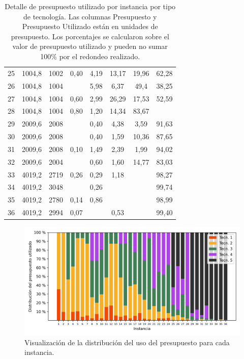 \begin{table}
\begin{tabular}{SSSSSSSS}
      25 & 1004,8 & 1002 & 0,40 & 4,19 & 13,17 & 19,96 & 62,28 \\
      26 & 1004,8 & 1004 &  & 5,98 & 6,37 & 49,4 & 38,25 \\
      27 & 1004,8 & 1004 & 0,60 & 2,99 & 26,29 & 17,53 & 52,59 \\
      28 & 1004,8 & 1004 & 0,80 & 1,20 & 14,34 & 83,67 &  \\
      29 & 2009,6 & 2008 &  & 0,40 & 4,38 & 3,59 & 91,63 \\
      30 & 2009,6 & 2008 &  & 0,40 & 1,59 & 10,36 & 87,65 \\
      31 & 2009,6 & 2008 & 0,10 & 1,49 & 2,39 & 1,99 & 94,02 \\
      32 & 2009,6 & 2004 &  & 0,60 & 1,60 & 14,77 & 83,03 \\
      33 & 4019,2 & 2719 & 0,26 & 0,29 & 1,18 &  & 98,27 \\
      34 & 4019,2 & 3048 &  & 0,26 &  &  & 99,74 \\
      35 & 4019,2 & 2780 & 0,14 & 0,86 &  &  & 98,99 \\
      36 & 4019,2 & 2994 & 0,07 &  & 0,53 &  & 99,40 \\
      \bottomrule
  \end{tabular}
  \caption{Detalle de presupuesto utilizado por instancia por tipo de tecnología. Las columnas Presupuesto y Presupuesto Utilizado están en unidades de presupuesto. Los porcentajes se calcularon sobre el valor de presupuesto utilizado y pueden no sumar 100\% por el redondeo realizado.} \label{table:sensibilitybudgetusage}
\end{table}

\begin{figure}[h!]
  \centering
  \includegraphics[width=\linewidth]{../resources/budget_use_by_infra.png}
  \caption{Visualización de la distribución del uso del presupuesto para cada instancia.}
  \label{fig:sensibilitybudgetusage}
\end{figure}

